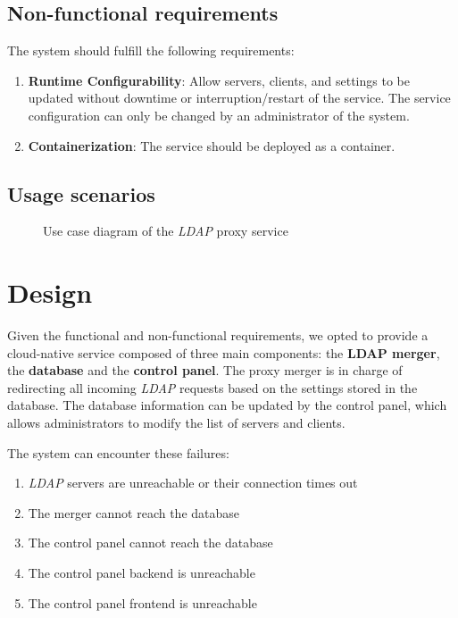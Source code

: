 \documentclass{scrartcl}
\begin{document}
\subsection{Non-functional requirements}

\par The system should fulfill the following requirements:

\begin{enumerate}
    \item \textbf{Runtime Configurability}: Allow servers, clients, and settings to be updated without downtime or interruption/restart of the service. The service configuration can only be changed by an administrator of the system.
    \item \textbf{Containerization}: The service should be deployed as a container.
\end{enumerate}

\subsection{Usage scenarios}

\begin{figure}[h]
    \centering
    
    \caption{Use case diagram of the \textit{LDAP} proxy service}
    \label{fig:usecase} 
\end{figure}

\section{Design}
\label{sec:design}

\par Given the functional and non-functional requirements, we opted to provide a cloud-native service composed of three main components: the \textbf{LDAP merger}, the \textbf{database} and the \textbf{control panel}. The proxy merger is in charge of redirecting all incoming \textit{LDAP} requests based on the settings stored in the database. The database information can be updated by the control panel, which allows administrators to modify the list of servers and clients.
\par The system can encounter these failures:
\begin{enumerate}
	\item \textit{LDAP} servers are unreachable or their connection times out
	\item The merger cannot reach the database
	\item The control panel cannot reach the database
	\item The control panel backend is unreachable
	\item The control panel frontend is unreachable
\end{enumerate}
\end{document}
